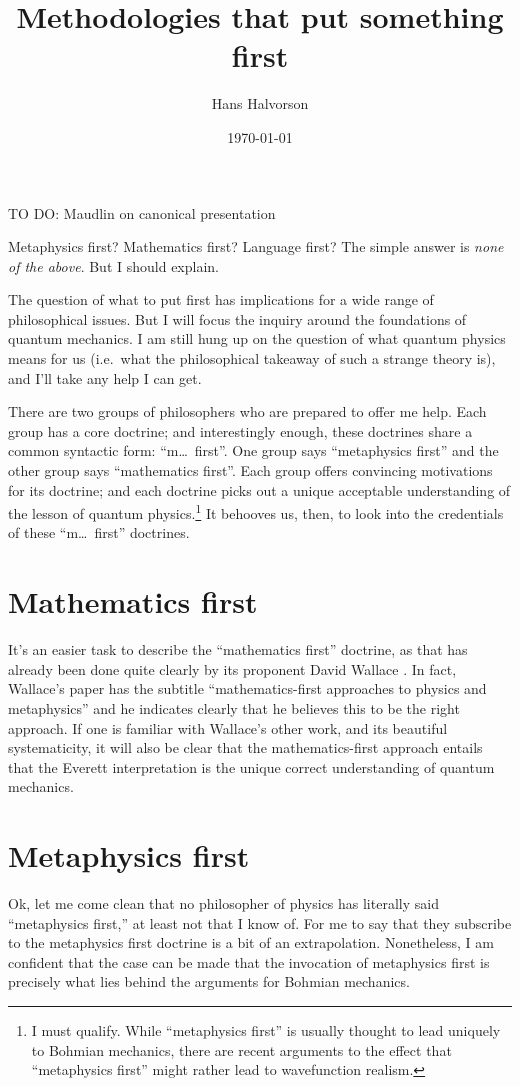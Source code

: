 \documentclass[12pt]{article}
\title{Methodologies that put something first}
\author{Hans Halvorson}
\date{\today}
\begin{document}
\maketitle

TO DO: Maudlin on canonical presentation

Metaphysics first? Mathematics first? Language first? The simple
answer is \emph{none of the above}. But I should explain.

The question of what to put first has implications for a wide range of
philosophical issues. But I will focus the inquiry around the
foundations of quantum mechanics. I am still hung up on the question
of what quantum physics means for us (i.e.\ what the philosophical
takeaway of such a strange theory is), and I'll take any help I can
get.

There are two groups of philosophers who are prepared to offer me
help. Each group has a core doctrine; and interestingly enough, these
doctrines share a common syntactic form: ``m\dots\ first''. One group
says ``metaphysics first'' and the other group says ``mathematics
first''. Each group offers convincing motivations for its doctrine;
and each doctrine picks out a unique acceptable understanding of the
lesson of quantum physics.\footnote{I must qualify. While
  ``metaphysics first'' is usually thought to lead uniquely to Bohmian
  mechanics, there are recent arguments to the effect that
  ``metaphysics first'' might rather lead to wavefunction realism.} It
behooves us, then, to look into the credentials of these ``m\dots\
first'' doctrines.

\section{Mathematics first}

It's an easier task to describe the ``mathematics first'' doctrine, as
that has already been done quite clearly by its proponent David
Wallace \citep{wallace2022}. In fact, Wallace's paper has the subtitle
``mathematics-first approaches to physics and metaphysics'' and he
indicates clearly that he believes this to be the right approach. If
one is familiar with Wallace's other work, and its beautiful
systematicity, it will also be clear that the mathematics-first
approach entails that the Everett interpretation is the unique correct
understanding of quantum mechanics.

\section{Metaphysics first}



Ok, let me come clean that no philosopher of physics has literally
said ``metaphysics first,'' at least not that I know of. For me to say
that they subscribe to the metaphysics first doctrine is a bit of an
extrapolation. Nonetheless, I am confident that the case can be made
that the invocation of metaphysics first is precisely what lies behind
the arguments for Bohmian mechanics.
\end{document}
